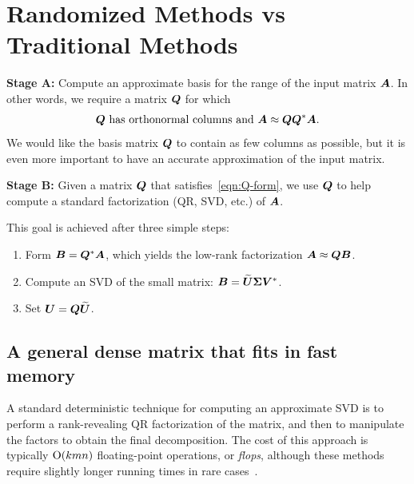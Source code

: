 \documentclass{article}
\begin{document}
\section{Randomized Methods vs Traditional Methods}

\textbf{Stage A:} Compute an approximate basis for the range of the input matrix $\bm{A}$. In other words,
we require a matrix $\bm{Q}$ for which
\begin{equation} \label{eqn:Q-form}
\text{$\bm{Q}$ has orthonormal columns and $\bm{A} \approx \bm{Q}\bm{Q}^{*}\bm{A}$.}
\end{equation}
We would like the basis matrix $\bm{Q}$ to contain as few columns as possible, but it is
even more important to have an accurate approximation of the input matrix.


\vspace{2mm}

\textbf{Stage B:}
Given a matrix $\bm{Q}$ that satisfies~\eqref{eqn:Q-form},
we use $\bm{Q}$ to help compute a standard factorization (QR, SVD, etc.) of $\bm{A}$.

This goal is achieved after three simple steps:
\begin{enumerate}
\item   Form $\bm{B} = \bm{Q}^{*}\bm{A}$, which yields
the low-rank factorization $\bm{A} \approx \bm{Q}\bm{B}$.
\item   Compute an SVD of the small matrix: $\bm{B} = \widetilde{\bm{U}}\bm{\Sigma}\bm{V}^{*}$.
\item   Set $\bm{U} = \bm{Q}\widetilde{\bm{U}}$.
\end{enumerate}

\subsection{A general dense matrix that fits in fast memory}
\label{sec:intro_fits in RAM}

A standard deterministic technique for computing an approximate SVD is to
perform a rank-revealing QR factorization of the matrix,
and then to manipulate the factors to obtain the final decomposition.
The cost of this approach is typically $\mathrm{O}(kmn)$ floating-point
operations, or \textit{flops}, although these methods require slightly
longer running times in rare cases~\cite{gu_rrqr}.
\end{document}

